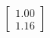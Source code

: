 \documentclass[preview]{standalone}
\begin{document}
\begin{align*}
\begin{bmatrix} 1.00 \\ 1.16 \end{bmatrix}
\end{align*}
\end{document}
